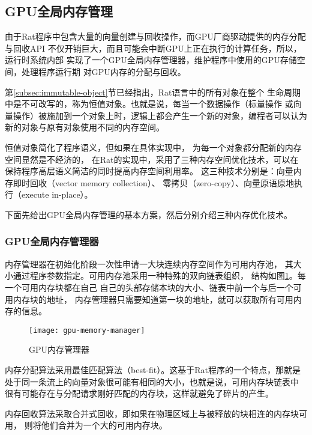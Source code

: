 \subsection{GPU全局内存管理}
由于Rat程序中包含大量的向量创建与回收操作，而GPU厂商驱动提供的内存分配与回收API
不仅开销巨大，而且可能会中断GPU上正在执行的计算任务，所以，运行时系统内部
实现了一个GPU全局内存管理器，维护程序中使用的GPU存储空间，处理程序运行期
对GPU内存的分配与回收。

第\ref{subsec:immutable-object}节已经指出，Rat语言中的所有对象在整个
生命周期中是不可改写的，称为恒值对象。也就是说，每当一个数据操作（标量操作
或向量操作）被施加到一个对象上时，逻辑上都会产生一个新的对象，编程者可以认为
新的对象与原有对象使用不同的内存空间。

恒值对象简化了程序语义，但如果在具体实现中，
为每一个对象都分配新的内存空间显然是不经济的，
在Rat的实现中，采用了三种内存空间优化技术，可以在
保持程序高层语义简洁的同时提高内存空间利用率。
这三种技术分别是：向量内存即时回收（vector memory collection）、
零拷贝（zero-copy）、向量原语原地执行（execute in-place）。

下面先给出GPU全局内存管理的基本方案，然后分别介绍三种内存优化技术。

\subsubsection{GPU全局内存管理器}
内存管理器在初始化阶段一次性申请一大块连续内存空间作为可用内存池，
其大小通过程序参数指定。可用内存池采用一种特殊的双向链表组织，
结构如图\ref{fig:gpu-memory-manager}。每一个可用内存块都在自己
自己的头部存储本块的大小、链表中前一个与后一个可用内存块的地址，
内存管理器只需要知道第一块的地址，就可以获取所有可用内存的信息。
\begin{figure}
  \centering
  \texttt{[image: gpu-memory-manager]}
  \caption{GPU内存管理器}
  \label{fig:gpu-memory-manager}
\end{figure}

内存分配算法采用最佳匹配算法（best-fit）。这基于Rat程序的一个特点，那就是
处于同一条流上的向量对象很可能有相同的大小，也就是说，可用内存块链表中
很有可能存在与分配请求刚好匹配的内存块，这样就避免了碎片的产生。

内存回收算法采取合并式回收，即如果在物理区域上与被释放的块相连的内存块可用，
则将他们合并为一个大的可用内存块。

